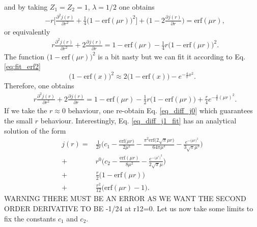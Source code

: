 \documentclass[aip,jcp,reprint,noshowkeys,superscriptaddress]{revtex4-1}
\newcommand{\deriv}[3]{\frac{\partial^{#3} #1}{\partial {#2}^{#3}}}
\begin{document}
and by taking $Z_1 = Z_2 = 1$, $\lambda = 1/2$ one obtains 
\begin{equation}
 \begin{aligned}
& - r \bigg[ \deriv{j(r)}{r}{2} + \frac{1}{4} \big( 1 - \text{erf}(\mu r)\big)^2\bigg] + \bigg( 1 - 2 \deriv{j(r)}{r}{} \bigg)   = \text{erf}(\mu r),
 \end{aligned}
\end{equation}
or equivalently 
\begin{equation}
 \begin{aligned}
 \label{eq_diff_j1_erf2}
& r \deriv{j(r)}{r}{2} + 2 \deriv{j(r)}{r}{}  =  1 - \text{erf}(\mu r) - \frac{1}{4} r \big( 1 - \text{erf}(\mu r)\big)^2.
 \end{aligned}
\end{equation}
The function $\big( 1 - \text{erf}(\mu r)\big)^2$ is a bit nasty but we can fit it according to Eq. \eqref{eq:fit_erf2}
\begin{equation}
 \big(1 - \text{erf}(x)\big)^2 \approx 2\big( 1 - \text{erf}(x)\big) - e^{-\frac{4}{\pi} x^2}.
\end{equation}
Therefore, one obtains 
\begin{equation}
 \begin{aligned}
 \label{eq_diff_j1_fit}
& r \deriv{j(r)}{r}{2} + 2 \deriv{j(r)}{r}{}  =  1 - \text{erf}(\mu r) - \frac{1}{2} r \big( 1 - \text{erf}(\mu r)\big) + \frac{r}{4}e^{-\frac{4}{\pi} (\mu r)^2}. 
 \end{aligned}
\end{equation}
If we take the $r\approx 0$  behaviour, one re-obtain Eq. \eqref{eq_diff_j0} which guarantees the small $r$ behaviour. 
Interestingly, Eq. \eqref{eq_diff_j1_fit} has an analytical solution of the form 
\begin{equation}
 \label{eq:j2_start}
 \begin{aligned}
  j(r) = & \frac{1}{2 r}\bigg( c_1 - \frac{\text{erf}\big(\mu r\big)}{2 \mu^2} - \frac{\pi^2 \text{erf}\big(2\sqrt{\pi}\mu r\big) }{64 \pi \mu^3} - \frac{e^{-\big(\mu r \big)^2}}{3\sqrt{\pi}\mu^3} \bigg) \\
       + & r^0 \bigg( c_2 - \frac{\text{erf}(\mu r)}{8 \mu^2} - \frac{e^{-\big( \mu^r \big)^2}}{2 \sqrt{\pi} \mu} \bigg)\\
       + & \frac{r}{2} \bigg( 1 - \text{erf}(\mu r) \bigg) \\
       + & \frac{r^2}{12} \bigg( \text{erf}(\mu r) -1 \bigg).
 \end{aligned}
\end{equation}
WARNING THERE MUST BE AN ERROR AS WE WANT THE SECOND ORDER DERIVATIVE TO BE -1/24 at r12=0.
Let us now take some limits to fix the constants $c_1$ and $c_2$. 
\end{document}
